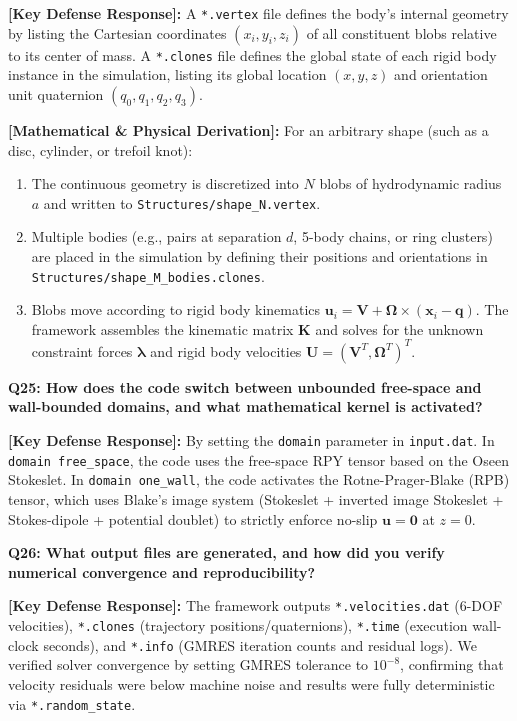 \documentclass[11pt,a4paper]{article}
\newcommand{\question}[2]{
    \vspace{0.4cm}
    \noindent\colorbox{blue!10}{\parbox{\dimexpr\textwidth-2\fboxsep\relax}{
        \textbf{#1: #2}
    }}
    \vspace{0.2cm}
}
\newcommand{\shortanswer}[1]{
    \noindent\textbf{\textcolor{green!50!black}{[Key Defense Response]:}} #1
    \vspace{0.2cm}
}
\newcommand{\deepdetails}[1]{
    \noindent\textbf{\textcolor{blue!60!black}{[Mathematical \& Physical Derivation]:}} #1
    \vspace{0.2cm}
}
\begin{document}
\shortanswer{A \texttt{*.vertex} file defines the body's internal geometry by listing the Cartesian coordinates $(x_i, y_i, z_i)$ of all constituent blobs relative to its center of mass. A \texttt{*.clones} file defines the global state of each rigid body instance in the simulation, listing its global location $(x, y, z)$ and orientation unit quaternion $(q_0, q_1, q_2, q_3)$.}

\deepdetails{
For an arbitrary shape (such as a disc, cylinder, or trefoil knot):
\begin{enumerate}
    \item The continuous geometry is discretized into $N$ blobs of hydrodynamic radius $a$ and written to \texttt{Structures/shape\_N.vertex}.
    \item Multiple bodies (e.g., pairs at separation $d$, 5-body chains, or ring clusters) are placed in the simulation by defining their positions and orientations in \texttt{Structures/shape\_M\_bodies.clones}.
    \item Blobs move according to rigid body kinematics $\mathbf{u}_i = \mathbf{V} + \mathbf{\Omega} \times (\mathbf{x}_i - \mathbf{q})$. The framework assembles the kinematic matrix $\mathbf{K}$ and solves for the unknown constraint forces $\boldsymbol{\lambda}$ and rigid body velocities $\mathbf{U} = (\mathbf{V}^T, \mathbf{\Omega}^T)^T$.
\end{enumerate}
}

\vspace{0.4cm}
\question{Q25}{How does the code switch between unbounded free-space and wall-bounded domains, and what mathematical kernel is activated?}

\shortanswer{By setting the \texttt{domain} parameter in \texttt{input.dat}. In \texttt{domain free\_space}, the code uses the free-space RPY tensor based on the Oseen Stokeslet. In \texttt{domain one\_wall}, the code activates the Rotne-Prager-Blake (RPB) tensor, which uses Blake's image system (Stokeslet + inverted image Stokeslet + Stokes-dipole + potential doublet) to strictly enforce no-slip $\mathbf{u} = \mathbf{0}$ at $z = 0$.}

\vspace{0.4cm}
\question{Q26}{What output files are generated, and how did you verify numerical convergence and reproducibility?}

\shortanswer{The framework outputs \texttt{*.velocities.dat} ($6$-DOF velocities), \texttt{*.clones} (trajectory positions/quaternions), \texttt{*.time} (execution wall-clock seconds), and \texttt{*.info} (GMRES iteration counts and residual logs). We verified solver convergence by setting GMRES tolerance to $10^{-8}$, confirming that velocity residuals were below machine noise and results were fully deterministic via \texttt{*.random\_state}.}
\end{document}
